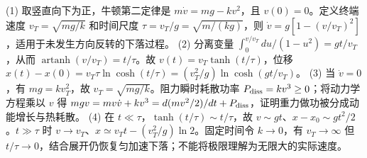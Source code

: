 (1) 取竖直向下为正，牛顿第二定律是 \(m\dot v=mg-kv^2\)，且 \(v(0)=0\)。定义终端速度 \(v_T=\sqrt{mg/k}\) 和时间尺度 \(\tau=v_T/g=\sqrt{m/(kg)}\)，则 \(\dot v=g[1-(v/v_T)^2]\)，适用于未发生方向反转的下落过程。
(2) 分离变量 \(\int_0^{v/v_T}du/(1-u^2)=gt/v_T\)，从而 \(\operatorname{artanh}(v/v_T)=t/\tau\)。故 \(v(t)=v_T\tanh(t/\tau)\)，位移 \(x(t)-x(0)=v_T\tau\ln\cosh(t/\tau)=(v_T^2/g)\ln\cosh(gt/v_T)\)。
(3) 当 \(\dot v=0\)，有 \(mg=kv_T^2\)，故 \(v_T=\sqrt{mg/k}\)。阻力瞬时耗散功率 \(P_{\rm diss}=kv^3\ge0\)；将动力学方程乘以 \(v\) 得 \(mgv=m v\dot v+kv^3=d(mv^2/2)/dt+P_{\rm diss}\)，证明重力做功被分成动能增长与热耗散。
(4) 在 \(t\ll\tau\)，\(\tanh(t/\tau)\sim t/\tau\)，故 \(v\sim gt\)、\(x-x_0\sim gt^2/2\)。\(t\gg\tau\) 时 \(v\to v_T\)、\(x\simeq v_Tt-(v_T^2/g)\ln2\)。固定时间令 \(k\to0\)，有 \(v_T\to\infty\) 但 \(t/\tau\to0\)，结合展开仍恢复匀加速下落；不能将极限理解为无限大的实际速度。
